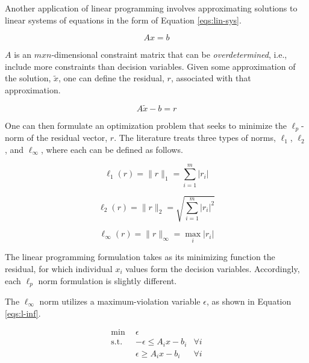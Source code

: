 Another application of linear programming involves approximating solutions to
linear systems of equations in the form of Equation \ref{eqs:lin-sys}.

\begin{equation}\label{eqs:lin-sys}
A x = b
\end{equation}

$A$ is an $m x n$-dimensional constraint matrix that can
be \textit{overdetermined}, i.e., include more constraints than decision
variables. Given some approximation of the solution, $\tilde{x}$, one can define
the residual, $r$, associated with that approximation.

\begin{equation}\label{eqs:lin-sys}
A \tilde{x} - b = r
\end{equation}

One can then formulate an optimization problem that seeks to minimize the
$\ell_p$-norm of the residual vector, $r$. The literature treats three types of
norms, $\ell_1$, $\ell_2$, and $\ell_\infty$, where each can be defined as
follows.

\begin{equation}
\ell_1 (r) = \| r \|_1 = \sum_{i = 1}^{m} | r_i |
\end{equation}

\begin{equation}
\ell_2 (r) = \| r \|_2 = \sqrt{ \sum_{i = 1}^{m} | r_i |^2 }
\end{equation}

\begin{equation}
\ell_\infty (r) = \| r \|_\infty = \max_{i} | r_i |
\end{equation}

The linear programming formulation takes as its minimizing function the
residual, for which individual $x_i$ values form the decision
variables. Accordingly, each $\ell_p$ norm formulation is slightly
different. 

The $\ell_\infty$ norm utilizes a maximum-violation variable $\epsilon$, as shown
in Equation \ref{eqs:l-inf}.

\begin{subequations}\label{eqs:l-inf}
  \begin{align}
    \min \:\: & 
    \epsilon  \\
    \text{s.t.} \:\: &
    - \epsilon \leq A_i x - b_i
    & \forall i \\
    &
    \epsilon \geq A_i x - b_i
    & \forall i \\
  \end{align}
\end{subequations}

